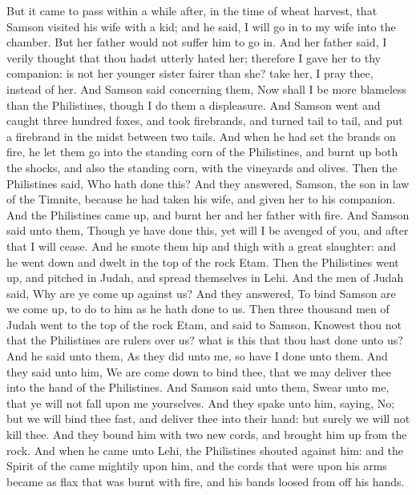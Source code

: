\begin{biblechapter} %
 But it came to pass within a while after, in the time of wheat harvest, that Samson visited his wife with a kid; and he said, I will go in to my wife into the chamber. But her father would not suffer him to go in.
\verse And her father said, I verily thought that thou hadst utterly hated her; therefore I gave her to thy companion: is not her younger sister fairer than she? take her, I pray thee, instead of her.
\verse And Samson said concerning them, Now shall I be more blameless than the Philistines, though I do them a displeasure.
\verse And Samson went and caught three hundred foxes, and took firebrands, and turned tail to tail, and put a firebrand in the midst between two tails.
\verse And when he had set the brands on fire, he let them go into the standing corn of the Philistines, and burnt up both the shocks, and also the standing corn, with the vineyards and olives.
\verse Then the Philistines said, Who hath done this? And they answered, Samson, the son in law of the Timnite, because he had taken his wife, and given her to his companion. And the Philistines came up, and burnt her and her father with fire.
\verse And Samson said unto them, Though ye have done this, yet will I be avenged of you, and after that I will cease.
\verse And he smote them hip and thigh with a great slaughter: and he went down and dwelt in the top of the rock Etam.
\verse Then the Philistines went up, and pitched in Judah, and spread themselves in Lehi.
\verse And the men of Judah said, Why are ye come up against us? And they answered, To bind Samson are we come up, to do to him as he hath done to us.
\verse Then three thousand men of Judah went to the top of the rock Etam, and said to Samson, Knowest thou not that the Philistines are rulers over us? what is this that thou hast done unto us? And he said unto them, As they did unto me, so have I done unto them.
\verse And they said unto him, We are come down to bind thee, that we may deliver thee into the hand of the Philistines. And Samson said unto them, Swear unto me, that ye will not fall upon me yourselves.
\verse And they spake unto him, saying, No; but we will bind thee fast, and deliver thee into their hand: but surely we will not kill thee. And they bound him with two new cords, and brought him up from the rock.
\verse And when he came unto Lehi, the Philistines shouted against him: and the Spirit of the \LORD came mightily upon him, and the cords that were upon his arms became as flax that was burnt with fire, and his bands loosed from off his hands.

\end{biblechapter}

